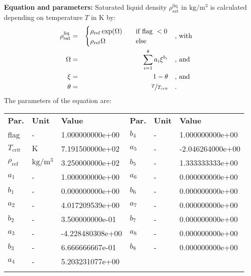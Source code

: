 \textbf{Equation and parameters:}
\newline
%
Saturated liquid density $\rho_\mathrm{sat}^\mathrm{liq}$ in $\si{\kilogram\per\cubic\meter}$ is calculated depending on temperature $T$ in $\si{\kelvin}$ by:
%
\begin{equation*}
\begin{split}
\rho_\mathrm{sat}^\mathrm{liq} &=& \begin{cases} \rho_\mathrm{ref} \exp(\Omega) & \quad \text{if flag } < 0 \\ \rho_\mathrm{ref} \Omega & \quad \text{else} \end{cases} & \quad\text{, with} \\
\Omega &=& \sum_{i=1}^{8} a_i \xi^{b_i} & \quad\text{, and} \\
\xi &=& 1 - \theta & \quad\text{, and} \\
\theta &=& \nicefrac{T}{T_\mathrm{crit}} & \quad\text{.}
\end{split}
\end{equation*}
%
The parameters of the equation are:
%
\begin{longtable}[l]{lll|lll}
\toprule
\addlinespace
\textbf{Par.} & \textbf{Unit} & \textbf{Value} &	\textbf{Par.} & \textbf{Unit} & \textbf{Value} \\
\addlinespace
\midrule
\endhead

\bottomrule
\endfoot
\bottomrule
\endlastfoot
\addlinespace

flag & - & 1.000000000e+00 & $b_4$ & - & 1.000000000e+00 \\
$T_\mathrm{crit}$ & $\si{\kelvin}$ & 7.191500000e+02 & $a_5$ & - & -2.046264000e+00 \\
$\rho_\mathrm{ref}$ & $\si{\kilogram\per\cubic\meter}$ & 3.250000000e+02 & $b_5$ & - & 1.333333333e+00 \\
$a_1$ & - & 1.000000000e+00 & $a_6$ & - & 0.000000000e+00 \\
$b_1$ & - & 0.000000000e+00 & $b_6$ & - & 0.000000000e+00 \\
$a_2$ & - & 4.017209539e+00 & $a_7$ & - & 0.000000000e+00 \\
$b_2$ & - & 3.500000000e-01 & $b_7$ & - & 0.000000000e+00 \\
$a_3$ & - & -4.228480308e+00 & $a_8$ & - & 0.000000000e+00 \\
$b_3$ & - & 6.666666667e-01 & $b_8$ & - & 0.000000000e+00 \\
$a_4$ & - & 5.203231077e+00 & & & \\

\addlinespace\end{longtable}

